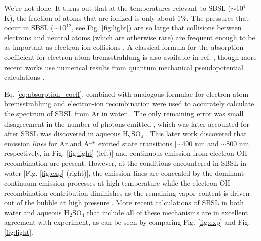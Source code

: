 \documentclass[11pt,prb,aps,nofootinbib,superscriptaddress,floatfix]{revtex4-2}
\begin{document}
We're not done. It turns out that at the temperatures relevant to SBSL ($\sim 10^4$ K), the fraction of atoms that are ionized is only about $1\%$. The pressures that occur in SBSL ($\sim10^{12}$, see Fig. \ref{fig:light}) are so large that collisions between electrons and neutral atoms (which are otherwise rare) are frequent enough to be as important as electron-ion collisions \cite{zel2002physics,hilgenfeldt1999simple,frommhold1998electron}. A classical formula for the absorption coefficient for electron-atom bremsstrahlung is also available in ref. \cite{zel2002physics}, though more recent works \cite{an2006mechanism,an2008spectral,an2009diagnosing} use numerical results from quantum mechanical pseudopotential calculations \cite{geltman1973free}. 

Eq. \ref{eq:absorption_coeff}, combined with analogous formulae for electron-atom bremsstrahlung \cite{geltman1973free} and electron-ion recombination \cite{zel2002physics} were used to accurately calculate the spectrum of SBSL from Ar in water \cite{hilgenfeldt1999simple,hilgenfeldt1999sonoluminescence,hammer2002light,yasui2001effect,yasui1999mechanism}. The only remaining error was small disagreement in the number of photons emitted \cite{an2006mechanism}, which was later accounted for after SBSL was discovered in aqueous H$_2$SO$_4$ \cite{flannigan2005plasma,flannigan2005plasma1,flannigan2006measurement,suslick2008inside}. This later work discovered that emission \emph{lines} for Ar and Ar$^+$ excited state transitions [$\sim 400$ nm and $\sim 800$ nm, respectively, in Fig. \ref{fig:light} (left)] and continuous emission from electron-OH$^{+}$ recombination are present. However, at the conditions encountered in SBSL in water [Fig. \ref{fig:exp} (right)], the emission lines are concealed by the dominant continuum emission processes at high temperature while the electron-OH$^{+}$ recombination contribution diminishes as the remaining vapor content is driven out of the bubble at high pressure \cite{suslick2008inside,flannigan2005plasma,flannigan2005plasma1,flannigan2006measurement}. More recent calculations of SBSL in both water and aqueous H$_2$SO$_4$ that include all of these mechanisms are in excellent agreement with experiment, as can be seen by comparing Fig. \ref{fig:exp} and Fig. \ref{fig:light}. 
\end{document}

